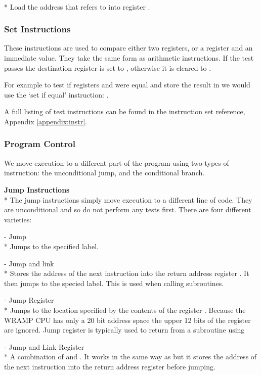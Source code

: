  \\*
Load the address that  refers to into register \regd.  

\subsubsection{Set Instructions}
These instructions are used to compare either two registers, or a
register and an immediate value.  They take the same form as
arithmetic instructions.  If the test passes the destination register
is set to , otherwise it is cleared to .

For example to test if registers  and  were equal and store the
result in  we would use the `set if equal' instruction: 
.

A full listing of test instructions can be found in the instruction set reference, Appendix \ref{appendix:instr}.

\subsubsection{Program Control}
We move execution to a different part of the program using two types of 
instruction: the unconditional jump, and the conditional branch.  

\textbf{Jump Instructions}\\*
The jump instructions simply move execution to a different line of
code.  They are unconditional and so do not perform any tests first.
There are four different varieties:

  - Jump\\*
Jumps to the specified label.

 - Jump and link\\*
Stores the address of the next instruction into the return address register . It then jumps to the specied label. This is used when calling subroutines.

  -  Jump Register\\*
Jumps to the location specified by the contents of the register \regs.  
Because the WRAMP CPU has only a 20 bit address space the upper 12 bits 
of the register are ignored.  Jump register is typically used to 
return from a subroutine using 

 - Jump and Link Register\\* A combination of
 and . It works in the same way as  but it
stores the address of the next instruction into the return address
register before jumping. 

